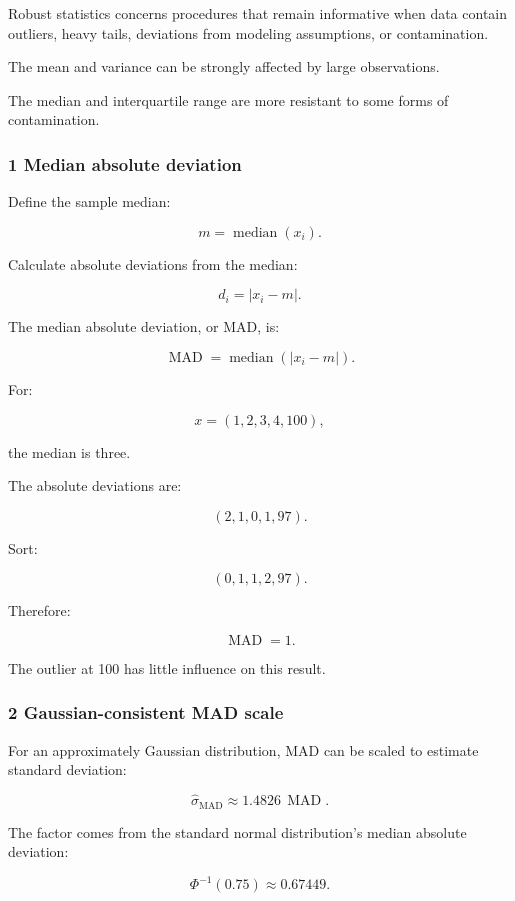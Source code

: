 Robust statistics concerns procedures that remain informative when data contain outliers, heavy tails, deviations from modeling assumptions, or contamination.

The mean and variance can be strongly affected by large observations.

The median and interquartile range are more resistant to some forms of contamination.

\subsubsection{1 Median absolute deviation}\label{02-foundations-ii-ch030-median-absolute-deviation}

Define the sample median:

\[
 m=\operatorname{median}(x_i).
\]

Calculate absolute deviations from the median:

\[
 d_i=|x_i-m|.
\]

The median absolute deviation, or MAD, is:

\[
 \boxed{ \operatorname{MAD} = \operatorname{median}(|x_i-m|) }.
\]

For:

\[
 x=(1,2,3,4,100),
\]

the median is three.

The absolute deviations are:

\[
 (2,1,0,1,97).
\]

Sort:

\[
 (0,1,1,2,97).
\]

Therefore:

\[
 \boxed{\operatorname{MAD}=1}.
\]

The outlier at 100 has little influence on this result.

\subsubsection{2 Gaussian-consistent MAD scale}\label{02-foundations-ii-ch030-gaussian-consistent-mad-scale}

For an approximately Gaussian distribution, MAD can be scaled to estimate standard deviation:

\[
 \boxed{ \hat\sigma_{\mathrm{MAD}} \approx1.4826\,\operatorname{MAD} }.
\]

The factor comes from the standard normal distribution's median absolute deviation:

\[
 \Phi^{-1}(0.75)\approx0.67449.
\]

